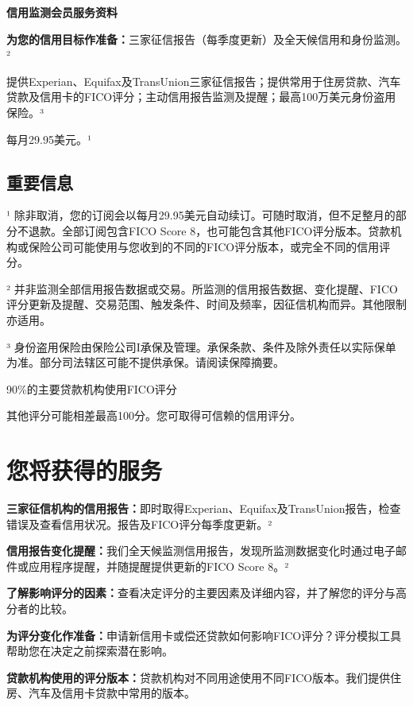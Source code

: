 \documentclass[UTF8,fontset=none,11pt,a4paper]{ctexart}
\begin{document}
{\noindent\fontsize{20}{25}\selectfont\bfseries 信用监测会员服务资料\par}
\vspace{10pt}
\textbf{为您的信用目标作准备：}三家征信报告（每季度更新）及全天候信用和身份监测。²


提供Experian、Equifax及TransUnion三家征信报告；提供常用于住房贷款、汽车贷款及信用卡的FICO评分；主动信用报告监测及提醒；最高100万美元身份盗用保险。³


每月29.95美元。¹


\subsection*{重要信息}
¹ 除非取消，您的订阅会以每月29.95美元自动续订。可随时取消，但不足整月的部分不退款。全部订阅包含FICO Score 8，也可能包含其他FICO评分版本。贷款机构或保险公司可能使用与您收到的不同的FICO评分版本，或完全不同的信用评分。


² 并非监测全部信用报告数据或交易。所监测的信用报告数据、变化提醒、FICO评分更新及提醒、交易范围、触发条件、时间及频率，因征信机构而异。其他限制亦适用。


³ 身份盗用保险由保险公司I承保及管理。承保条款、条件及除外责任以实际保单为准。部分司法辖区可能不提供承保。请阅读保障摘要。


90\%的主要贷款机构使用FICO评分


其他评分可能相差最高100分。您可取得可信赖的信用评分。


\section*{您将获得的服务}
\textbf{三家征信机构的信用报告：}即时取得Experian、Equifax及TransUnion报告，检查错误及查看信用状况。报告及FICO评分每季度更新。²


\textbf{信用报告变化提醒：}我们全天候监测信用报告，发现所监测数据变化时通过电子邮件或应用程序提醒，并随提醒提供更新的FICO Score 8。²


\textbf{了解影响评分的因素：}查看决定评分的主要因素及详细内容，并了解您的评分与高分者的比较。


\textbf{为评分变化作准备：}申请新信用卡或偿还贷款如何影响FICO评分？评分模拟工具帮助您在决定之前探索潜在影响。


\textbf{贷款机构使用的评分版本：}贷款机构对不同用途使用不同FICO版本。我们提供住房、汽车及信用卡贷款中常用的版本。
\end{document}
